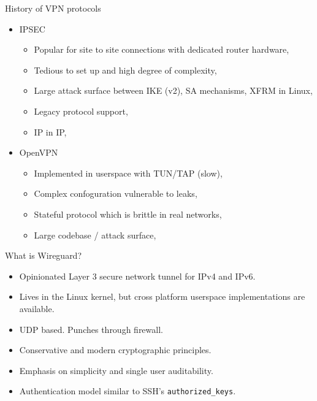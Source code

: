 \documentclass{beamer}
\begin{document}
    \begin{frame}{History of VPN protocols}
        \begin{itemize}
            \item IPSEC
                \begin{itemize}
                    \item Popular for site to site connections with dedicated router hardware,
                    \item Tedious to set up and high degree of complexity,
                    \item Large attack surface between IKE (v2), SA mechanisms, XFRM in Linux,
                    \item Legacy protocol support,
                    \item IP in IP,
                \end{itemize}
            \item OpenVPN
                \begin{itemize}
                    \item Implemented in userspace with TUN/TAP (slow),
                    \item Complex confoguration vulnerable to leaks,
                    \item Stateful protocol which is brittle in real networks,
                    \item Large codebase / attack surface,
                \end{itemize}
        \end{itemize}
    \end{frame}
    \begin{frame}{What is Wireguard?}
        \begin{itemize}
            \item Opinionated Layer 3 secure network tunnel for IPv4 and IPv6.
            \item Lives in the Linux kernel, but cross platform userspace implementations are available.
            \item UDP based. Punches through firewall.
            \item Conservative and modern cryptographic principles.
            \item Emphasis on simplicity and single user auditability.
            \item Authentication model similar to SSH's \texttt{authorized\_keys}.
        \end{itemize}
    \end{frame}
\end{document}
